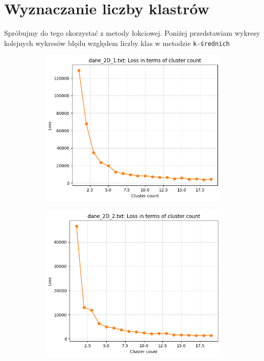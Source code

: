 \documentclass[polish,12pt,a4paper]{extarticle}
\begin{document}
\section*{Wyznaczanie liczby klastrów}
Spróbujmy do tego skorzystać z metody łokciowej. Poniżej przedstawiam wykresy kolejnych wykresów błędu względem liczby klas w metodzie \texttt{k-średnich}


\begin{figure}[h!]
    \centering
    \begin{subfigure}[b]{0.30\textwidth}
        \includegraphics[width=\linewidth]{img/elbow/data1.png}
        \captionsetup{labelformat=empty}
    \end{subfigure}
    \hfill
    \begin{subfigure}[b]{0.30\textwidth}
        \includegraphics[width=\linewidth]{img/elbow/data2.png}

\end{subfigure}
\end{figure}
\end{document}
